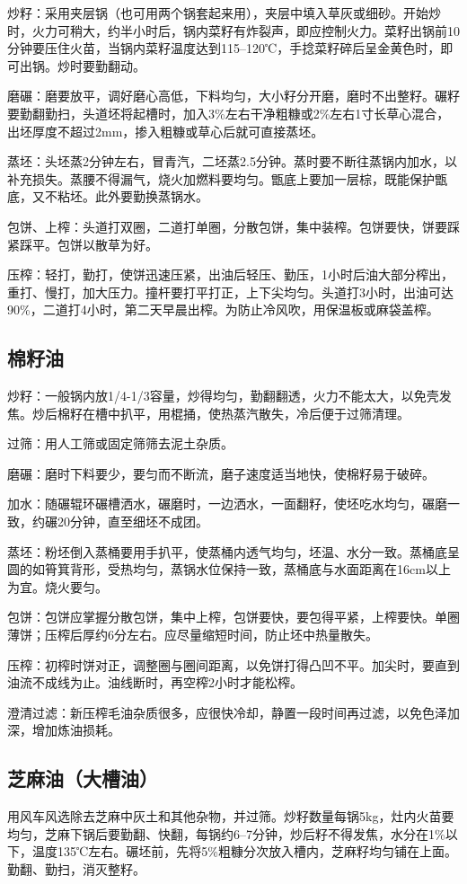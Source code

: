 \documentclass{ctexbook}
\begin{document}
炒籽：采用夹层锅（也可用两个锅套起来用），夹层中填入草灰或细砂。开始炒时，火力可稍大，约半小时后，锅内菜籽有炸裂声，即应控制火力。菜籽出锅前10分钟要压住火苗，当锅内菜籽温度达到115--120℃，手捻菜籽碎后呈金黄色时，即可出锅。炒时要勤翻动。

磨碾：磨要放平，调好磨心高低，下料均匀，大小籽分开磨，磨时不出整籽。碾籽要勤翻勤扫，头道坯将起槽时，加入3\%左右干净粗糠或2\%左右1寸长草心混合，出坯厚度不超过2mm，掺入粗糠或草心后就可直接蒸坯。

蒸坯：头坯蒸2分钟左右，冒青汽，二坯蒸2.5分钟。蒸时要不断往蒸锅内加水，以补充损失。蒸腰不得漏气，烧火加燃料要均匀。甑底上要加一层棕，既能保护甑底，又不粘坯。此外要勤换蒸锅水。

包饼、上榨：头道打双圈，二道打单圈，分散包饼，集中装榨。包饼要快，饼要踩紧踩平。包饼以散草为好。

压榨：轻打，勤打，使饼迅速压紧，出油后轻压、勤压，1小时后油大部分榨出，重打、慢打，加大压力。撞杆要打平打正，上下尖均匀。头道打3小时，出油可达90\%，二道打4小时，第二天早晨出榨。为防止冷风吹，用保温板或麻袋盖榨。
\subsection{棉籽油}
炒籽：一般锅内放1/4-1/3容量，炒得均匀，勤翻翻透，火力不能太大，以免壳发焦。炒后棉籽在槽中扒平，用棍捅，使热蒸汽散失，冷后便于过筛清理。

过筛：用人工筛或固定筛筛去泥土杂质。

磨碾：磨时下料要少，要匀而不断流，磨子速度适当地快，使棉籽易于破碎。

加水：随碾辊环碾槽洒水，碾磨时，一边洒水，一面翻籽，使坯吃水均匀，碾磨一致，约碾20分钟，直至细坯不成团。

蒸坯：粉坯倒入蒸桶要用手扒平，使蒸桶内透气均匀，坯温、水分一致。蒸桶底呈圆的如筲箕背形，受热均匀，蒸锅水位保持一致，蒸桶底与水面距离在16cm以上为宜。烧火要匀。

包饼：包饼应掌握分散包饼，集中上榨，包饼要快，要包得平紧，上榨要快。单圈薄饼；压榨后厚约6分左右。应尽量缩短时间，防止坯中热量散失。

压榨：初榨时饼对正，调整圈与圈间距离，以免饼打得凸凹不平。加尖时，要直到油流不成线为止。油线断时，再空榨2小时才能松榨。

澄清过滤：新压榨毛油杂质很多，应很快冷却，静置一段时间再过滤，以免色泽加深，增加炼油损耗。
\subsection{芝麻油（大槽油）}
用风车风选除去芝麻中灰土和其他杂物，并过筛。炒籽数量每锅5kg，灶内火苗要均匀，芝麻下锅后要勤翻、快翻，每锅约6--7分钟，炒后籽不得发焦，水分在1\%以下，温度135℃左右。碾坯前，先将5\%粗糠分次放入槽内，芝麻籽均匀铺在上面。勤翻、勤扫，消灭整籽。
\end{document}
